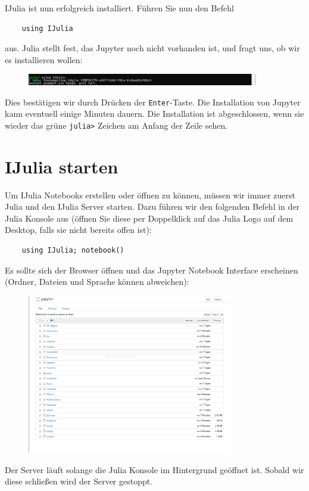 \documentclass[11pt, a4paper]{scrartcl}
\begin{document}
	IJulia ist nun erfolgreich installiert. Führen Sie nun den Befehl
	
	\begin{lstlisting}
	using IJulia
	\end{lstlisting}
	
	aus. Julia stellt fest, das Jupyter noch nicht vorhanden ist, und fragt uns, ob wir es installieren wollen:
	
	\begin{figure}[h!]
	\centering
	\includegraphics[width=0.9\textwidth]{imgs/Jupyter_install.png}
	\end{figure}

	Dies bestätigen wir durch Drücken der \texttt{Enter}-Taste. Die Installation von Jupyter kann eventuell einige Minuten dauern. Die Installation ist abgeschlossen, wenn sie wieder das grüne \texttt{julia>} Zeichen am Anfang der Zeile sehen.
	
	\section{IJulia starten}
	
	Um IJulia Notebooks erstellen oder öffnen zu können, müssen wir immer zuerst Julia und den IJulia Server starten. Dazu führen wir den folgenden Befehl in der Julia Konsole aus (öffnen Sie diese per Doppelklick auf das Julia Logo auf dem Desktop, falls sie nicht bereits offen ist):
	
	\begin{lstlisting}
	using IJulia; notebook()
	\end{lstlisting}
	
	Es sollte sich der Browser öffnen und das Jupyter Notebook Interface erscheinen (Ordner, Dateien und Sprache können abweichen):
	
	\begin{figure}[h!]
	\centering
	\includegraphics[width=0.8\textwidth]{imgs/jupyter.png}
	\end{figure}
	
	Der Server läuft solange die Julia Konsole im Hintergrund geöffnet ist. Sobald wir diese schließen wird der Server gestoppt.
	
	
	
	
	
\end{document}
